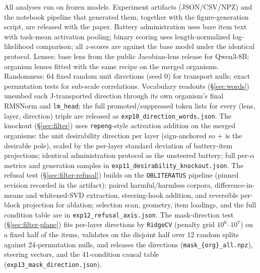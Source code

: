 \documentclass[11pt]{article}
\begin{document}
All analyses run on frozen models. Experiment artifacts (JSON/CSV/NPZ) and the notebook pipeline
that generated them, together with the figure-generation script, are released with the paper.
Battery administration uses bare item text with task-mean activation pooling; binary scoring uses
length-normalized log-likelihood comparison; all $z$-scores are against the base model under the
identical protocol. Lenses: base lens from the public Jacobian-lens release for Qwen3-8B; organism
lenses fitted with the same recipe on the merged organisms. Randomness: 64 fixed random unit
directions (seed 0) for transport nulls; exact permutation tests for sub-scale correlations.
Vocabulary readouts (\S\ref{sec:words}) unembed each J-transported direction through its own
organism's final RMSNorm and \texttt{lm\_head}; the full promoted/suppressed token lists for
every (lens, layer, direction) triple are released as \texttt{exp10\_direction\_words.json}.
The knockout (\S\ref{sec:filter}) uses \texttt{repeng}-style activation addition on the merged
organisms: the unit desirability direction per layer (sign-anchored so $+$ is the desirable
pole), scaled by the per-layer standard deviation of battery-item projections; identical
administration protocol as the unsteered battery; full per-$\alpha$ metrics and generation
samples in \texttt{exp11\_desirability\_knockout.json}.
The refusal test (\S\ref{sec:filter-refusal}) builds on the \texttt{OBLITERATUS} pipeline
(pinned revision recorded in the artifact): paired harmful/harmless corpora, difference-in-means
and whitened-SVD extraction, steering-hook addition, and reversible per-block projection for
ablation; selection scan, geometry, item loadings, and the full condition table are in
\texttt{exp12\_refusal\_axis.json}. The mask-direction test (\S\ref{sec:filter-plane}) fits
per-layer directions by \texttt{RidgeCV} (penalty grid $10^0$--$10^7$) on a fixed half of the
items, validates on the disjoint half over 12 random splits against 24-permutation nulls, and
releases the directions (\texttt{mask\_\{org\}\_all.npz}), steering vectors, and the
41-condition causal table (\texttt{exp13\_mask\_direction.json}).
\end{document}
